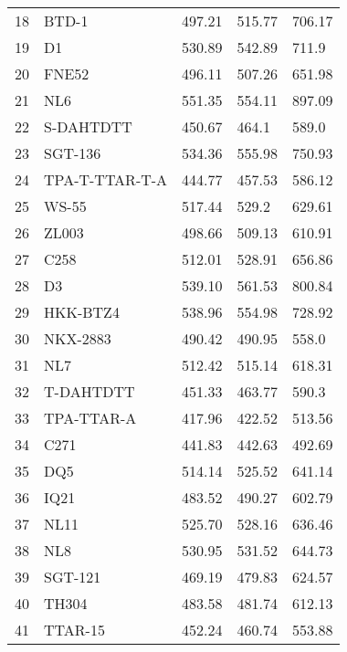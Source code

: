 \begin{tabular}{llrll}
18 &           BTD-1 &                 497.21 &                515.77 &              706.17 \\
19 &              D1 &                 530.89 &                542.89 &               711.9 \\
20 &           FNE52 &                 496.11 &                507.26 &              651.98 \\
21 &             NL6 &                 551.35 &                554.11 &              897.09 \\
22 &       S-DAHTDTT &                 450.67 &                 464.1 &               589.0 \\
23 &         SGT-136 &                 534.36 &                555.98 &              750.93 \\
24 &  TPA-T-TTAR-T-A &                 444.77 &                457.53 &              586.12 \\
25 &           WS-55 &                 517.44 &                 529.2 &              629.61 \\
26 &           ZL003 &                 498.66 &                509.13 &              610.91 \\
27 &            C258 &                 512.01 &                528.91 &              656.86 \\
28 &              D3 &                 539.10 &                561.53 &              800.84 \\
29 &        HKK-BTZ4 &                 538.96 &                554.98 &              728.92 \\
30 &        NKX-2883 &                 490.42 &                490.95 &               558.0 \\
31 &             NL7 &                 512.42 &                515.14 &              618.31 \\
32 &       T-DAHTDTT &                 451.33 &                463.77 &               590.3 \\
33 &      TPA-TTAR-A &                 417.96 &                422.52 &              513.56 \\
34 &            C271 &                 441.83 &                442.63 &              492.69 \\
35 &             DQ5 &                 514.14 &                525.52 &              641.14 \\
36 &            IQ21 &                 483.52 &                490.27 &              602.79 \\
37 &            NL11 &                 525.70 &                528.16 &              636.46 \\
38 &             NL8 &                 530.95 &                531.52 &              644.73 \\
39 &         SGT-121 &                 469.19 &                479.83 &              624.57 \\
40 &           TH304 &                 483.58 &                481.74 &              612.13 \\
41 &         TTAR-15 &                 452.24 &                460.74 &              553.88 \\
\bottomrule
\end{tabular}
